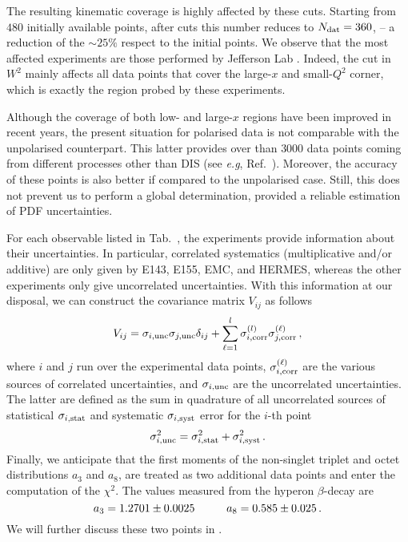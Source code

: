 The resulting kinematic coverage is highly affected by these cuts. Starting from $480$ initially available points, after cuts this number reduces to $N_{\textrm{dat}}=360$,  -- a reduction of the $\sim 25\%$ respect to the initial points. We observe that the most affected experiments are those performed by Jefferson Lab \cite{Kramer:2002tt, JeffersonLabHallA:2004tea, CLAS:2014qtg}. Indeed, the cut in $W^2$ mainly affects all data points that cover the large-$x$ and small-$Q^2$ corner, which is exactly the region probed by these experiments.\par
Although the coverage of both low- and large-$x$ regions have been improved in recent years, the present situation for polarised data is not comparable with the unpolarised counterpart. This latter provides over than $3000$ data points coming from different processes other than DIS (see \textit{e.g}, Ref.~\cite{Kassabov:2022pps}). Moreover, the accuracy of these points is also better if compared to the unpolarised case. Still, this does not prevent us to perform a global determination, provided a reliable estimation of PDF uncertainties.\par
For each observable listed in Tab.~, the experiments provide information about their uncertainties.
In particular, correlated systematics (multiplicative and/or additive) are only given by E143, E155, EMC, and HERMES, whereas the other experiments only give uncorrelated uncertainties. With this information at our disposal, we can construct the covariance matrix $V_{ij}$ as follows
\begin{equation}
  V_{ij} =  \sigma_{i,\textrm{unc}} \sigma_{j,\textrm{unc}} \delta_{ij} + \sum_{\ell=1}^{l} \sigma_{i,\textrm{corr}}^{(l)} \sigma_{j,\textrm{corr}}^{(\ell)} \,,
\end{equation}
where $i$ and $j$ run over the experimental data points, $\sigma_{i,\textrm{corr}}^{(\ell)}$ are the various sources of correlated uncertainties, and $\sigma_{i,\textrm{unc}}$ are the uncorrelated uncertainties. The latter are defined as the sum in quadrature of all uncorrelated sources of statistical $\sigma_{i,\textrm{stat}}$ and systematic $\sigma_{i,\textrm{syst}}$ error for the $i$-th point
\begin{equation}
  \sigma_{i,\textrm{unc}}^2 = \sigma_{i,\textrm{stat}}^2 + \sigma_{i,\textrm{syst}}^2 \,.
\end{equation}
Finally, we anticipate that the first moments of the non-singlet triplet and octet distributions $a_3$ and $a_8$, are treated as two additional data points and enter the computation of the $\chi^2$. The values measured from the hyperon $\beta$-decay are \cite{Nakamura_2010}
\begin{equation}
  a_3 = 1.2701 \pm 0.0025 \hspace{10mm} a_8 = 0.585 \pm 0.025 \,.
  \label{eq:a3_a8_values}
\end{equation}
We will further discuss these two points in .

